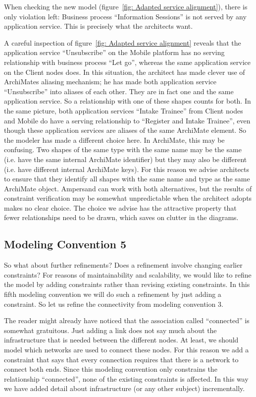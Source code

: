 \documentclass[sn-vancouver]{sn-jnl}%
\theoremstyle{thmstyleone}%
\theoremstyle{thmstyletwo}%
\theoremstyle{thmstylethree}%
\begin{document}
When checking the new model (figure~\ref{fig: Adapted service alignment}), there is only violation left:
Business process ``Information Sessions'' is not served by any application service.
This is precisely what the architects want.

A careful inspection of figure~\ref{fig: Adapted service alignment} reveals that
the application service ``Unsubscribe'' on the Mobile platform has no serving relationship with business process ``Let go'',
whereas the same application service on the Client nodes does.
In this situation, the architect has made clever use of ArchiMates aliasing mechanism;
he has made both application service ``Unsubscribe'' into aliases of each other.
They are in fact one and the same application service.
So a relationship with one of these shapes counts for both.
In the same picture, both application services ``Intake Trainee'' from Client nodes and Mobile do have a serving relationship to ``Register and Intake Trainee'',
even though these application services are aliases of the same ArchiMate element.
So the modeler has made a different choice here.
In ArchiMate, this may be confusing.
Two shapes of the same type with the same name may be the same (i.e. have the same internal ArchiMate identifier)
but they may also be different (i.e. have different internal ArchiMate keys).
For this reason we advise architects to ensure that they identify all shapes with the same name and type as the same ArchiMate object.
Ampersand can work with both alternatives, but the results of constraint verification may be somewhat unpredictable when the architect
adopts makes no clear choice.
The choice we advise has the attractive property that fewer relationships need to be drawn, which saves on clutter in the diagrams.

\subsection{Modeling Convention 5}\label{Modeling Convention 5}
So what about further refinements? Does a refinement involve changing earlier constraints?
For reasons of maintainability and scalability, we would like to refine the model by adding constraints rather than revising existing constraints.
In this fifth modeling convention we will do such a refinement by just adding a constraint.
So let us refine the connectivity from modeling convention 3.

The reader might already have noticed that the association called ``connected'' is somewhat gratuitous.
Just adding a link does not say much about the infrastructure that is needed between the different nodes.
At least, we should model which networks are used to connect these nodes.
For this reason we add a constraint that says that every connection requires that there is a network to connect both ends.
Since this modeling convention only constrains the relationship ``connected'',
none of the existing constraints is affected.
In this way we have added detail about infrastructure (or any other subject) incrementally.
\end{document}
